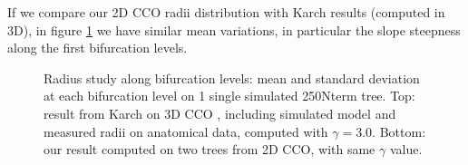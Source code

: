 \documentclass[a4paper, 11pt]{article} %
\begin{document}
If we compare our 2D CCO radii distribution with Karch results (computed in 3D), in figure \ref{fig:Karch radii study} we have similar mean variations, in particular the slope steepness along the first bifurcation levels.
\begin{figure}[htbp]
\centering
{}
\caption{Radius study along bifurcation levels: mean and standard deviation at each bifurcation level on 1 single simulated 250Nterm tree. Top: result from Karch on 3D CCO \cite{karch1999three}, including simulated model and measured radii on anatomical data, computed with $\gamma = 3.0$. Bottom: our result computed on two trees from 2D CCO, with same $\gamma$ value.}
\label{fig:Karch radii study}
\end{figure}
\end{document}
